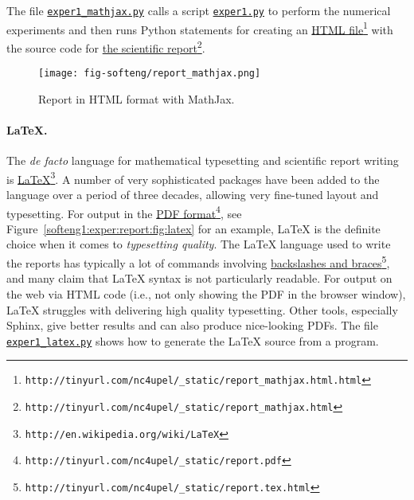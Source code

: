 \documentclass[graybox,sectrefs,envcountresetchap,open=right,final]{svmonodo}
\begin{document}
The file \href{{http://tinyurl.com/p96acy2/report_generation/exper1_html.py}}{\nolinkurl{exper1_mathjax.py}}
calls a script
\href{{http://tinyurl.com/p96acy2/exper1.py}}{\nolinkurl{exper1.py}}
to perform the numerical experiments and then runs Python
statements for creating an \href{{http://tinyurl.com/nc4upel/_static/report_mathjax.html.html}}{HTML file}\footnote{\texttt{http://tinyurl.com/nc4upel/\_static/report\_mathjax.html.html}} with the source code for \href{{http://tinyurl.com/nc4upel/_static/report_mathjax.html}}{the scientific report}\footnote{\texttt{http://tinyurl.com/nc4upel/\_static/report\_mathjax.html}}.


\begin{figure}[!ht]  %
  \centerline{\texttt{[image: fig-softeng/report\_mathjax.png]}}
  \caption{
  Report in HTML format with MathJax. \label{softeng1:exper:report:fig:mathjax}
  }
\end{figure}



\paragraph{{\LaTeX}.}

The \emph{de facto} language for mathematical typesetting and scientific
report writing is \href{{http://en.wikipedia.org/wiki/LaTeX}}{LaTeX}\footnote{\texttt{http://en.wikipedia.org/wiki/LaTeX}}. A
number of very sophisticated packages have been added to the language
over a period of three decades, allowing very fine-tuned layout and
typesetting. For output in the \href{{http://tinyurl.com/nc4upel/_static/report.pdf}}{PDF format}\footnote{\texttt{http://tinyurl.com/nc4upel/\_static/report.pdf}}, see Figure~\ref{softeng1:exper:report:fig:latex} for an example, {\LaTeX} is the
definite choice when it comes to \emph{typesetting quality}.
The {\LaTeX} language used to
write the reports has typically a lot of commands involving
\href{{http://tinyurl.com/nc4upel/_static/report.tex.html}}{backslashes and braces}\footnote{\texttt{http://tinyurl.com/nc4upel/\_static/report.tex.html}}, and many claim that
{\LaTeX} syntax is not particularly readable.  For output on the web via
HTML code (i.e., not only showing the PDF in the browser window), {\LaTeX}
struggles with delivering high quality typesetting. Other tools,
especially Sphinx, give better results and can also produce
nice-looking PDFs.  The file \href{{http://tinyurl.com/p96acy2/report_generation/exper1_latex.py}}{\nolinkurl{exper1_latex.py}} shows how to
generate the {\LaTeX} source from a program.
\end{document}
